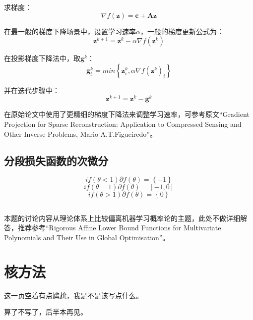 \documentclass[UTF8]{ctexart}
\begin{document}
求梯度：
$$\nabla f(\textbf{z})=\textbf{c}+\textbf{A}\textbf{z}$$

在最一般的梯度下降场景中，设置学习速率$\alpha$，一般的梯度更新公式为：
$$\textbf{z}^{k+1}=\textbf{z}^{k}-\alpha\nabla f(\textbf{z}^{k})$$

在投影梯度下降法中，取$\textbf{g}^{k}$：
$$\textbf{g}^{k}_{i}=min\left\{ \textbf{z}^{k}_{i},\alpha\nabla f(\textbf{z}^{k})_{i} \right\}$$

并在迭代步骤中：
$$\textbf{z}^{k+1}=\textbf{z}^{k} - \textbf{g}^{k}$$

在原始论文中使用了更精细的梯度下降法来调整学习速率，可参考原文“Gradient Projection for Sparse Reconstruction: Application to Compressed Sensing and Other Inverse Problems, Mario A.T.Figueiredo”。

\subsection{分段损失函数的次微分}
$$if(\theta < 1) \partial f(\theta)=\left\{ -1 \right\}$$
$$if(\theta = 1) \partial f(\theta)=[ -1,0 ]$$
$$if(\theta > 1) \partial f(\theta)=\left\{ 0 \right\}$$

\subsection{}
本题的讨论内容从理论体系上比较偏离机器学习概率论的主题，此处不做详细解答，推荐参考“Rigorous Affine Lower Bound Functions for Multivariate Polynomials and Their Use in Global Optimisation”。

\newpage
\section{核方法}
这一页空着有点尴尬，我是不是该写点什么。

算了不写了，后半本再见。
\end{document}
